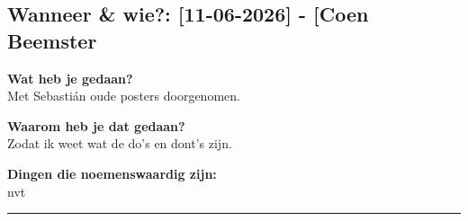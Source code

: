 
\subsection*{Wanneer \& wie?: [11-06-2026] - [Coen Beemster}

\textbf{Wat heb je gedaan?}\\
Met Sebastián oude posters doorgenomen.
\vspace{0.3cm} 

\noindent \textbf{Waarom heb je dat gedaan?}\\
Zodat ik weet wat de do's en dont's zijn.

\noindent \textbf{Dingen die noemenswaardig zijn:}\\
nvt


\vspace{0.5cm}
\hrule 
\vspace{0.5cm}
